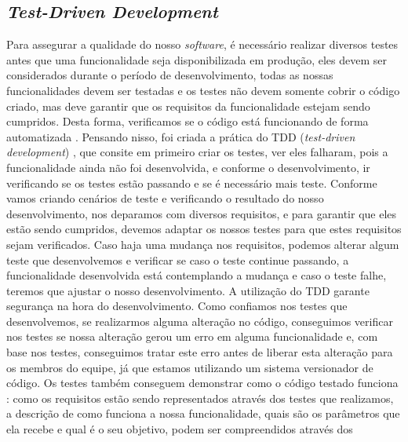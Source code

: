       \subsection{\textit{Test-Driven Development}}
        Para assegurar a qualidade do nosso \textit{software}, é necessário realizar
        diversos testes antes que uma funcionalidade seja disponibilizada em produção,
        eles devem ser considerados durante o período de desenvolvimento, todas
        as nossas funcionalidades devem ser testadas e os testes não devem somente
        cobrir o código criado, mas deve garantir que os requisitos da funcionalidade
        estejam sendo cumpridos. Desta forma, verificamos se o código está funcionando
        de forma automatizada \cite{CleanCode}. \newline
        Pensando nisso, foi criada a prática do TDD (\textit{test-driven development})
        \cite{TestDrivenDevelopment}, que consite em primeiro criar os testes, ver
        eles falharam, pois a funcionalidade ainda não foi desenvolvida, e conforme
        o desenvolvimento, ir verificando se os testes estão passando e se é necessário
        mais teste. Conforme vamos criando cenários de teste e verificando o resultado
        do nosso desenvolvimento, nos deparamos com diversos requisitos, e para
        garantir que eles estão sendo cumpridos, devemos adaptar os nossos testes para
        que estes requisitos sejam verificados. Caso haja uma mudança nos requisitos,
        podemos alterar algum teste que desenvolvemos e verificar se caso o teste
        continue passando, a funcionalidade desenvolvida está contemplando a mudança
        e caso o teste falhe, teremos que ajustar o nosso desenvolvimento. \newline
        A utilização do TDD garante segurança na hora do desenvolvimento. Como
        confiamos nos testes que desenvolvemos, se realizarmos alguma alteração
        no código, conseguimos verificar nos testes se nossa alteração gerou um
        erro em alguma funcionalidade e, com base nos testes, conseguimos tratar
        este erro antes de liberar esta alteração para os membros do equipe, já
        que estamos utilizando um sistema versionador de código. Os testes também
        conseguem demonstrar como o código testado funciona \cite{martin2007agile}:
        como os requisitos estão sendo representados através dos testes que realizamos,
        a descrição de como funciona a nossa funcionalidade, quais são os parâmetros
        que ela recebe e qual é o seu objetivo, podem ser compreendidos através dos
